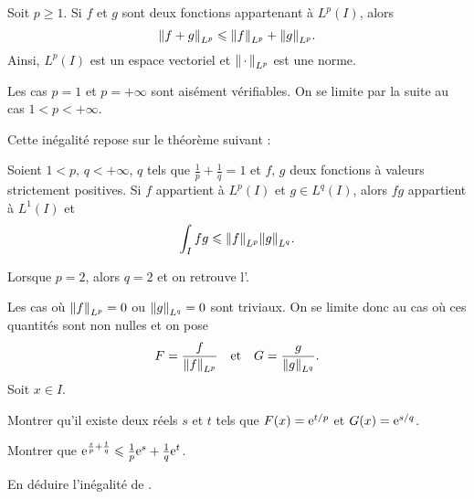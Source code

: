 \begin{theo}
Soit $p \geqslant 1$. Si $f$ et $g$ sont deux fonctions appartenant à $L^p(I)$, alors
\[
\norm{f + g}_{L^p} \leqslant \norm{f}_{L^p} + \norm{g}_{L^p}.
\]
Ainsi, $L^p(I)$ est un espace vectoriel et $\norm{\,\cdot\,}_{L^p}$ est une norme.
\end{theo}

\begin{remarque}
Les cas $p = 1$ et $p = +\infty$ sont aisément vérifiables. On se limite par la suite au cas $1 < p < +\infty$.
\end{remarque}

Cette inégalité repose sur le théorème suivant :
\begin{theo}
Soient $1 < p,\, q < +\infty$, $q$ tels que $\frac{1}{p} + \frac{1}{q} = 1$ et $f,\, g$ deux fonctions à valeurs strictement positives. Si $f$ appartient à $L^p(I)$ et $g \in L^q(I)$, alors $f g$ appartient à $L^1(I)$ et
\[
\int_I f g \leqslant \norm{f}_{L^p} \norm{g}_{L^q}.
\]
\end{theo}

\begin{remarque}
Lorsque $p = 2$, alors $q = 2$ et on retrouve l'.
\end{remarque}

\begin{exercice}
Les cas où $\norm{f}_{L^p} = 0$ ou $\norm{g}_{L^q} = 0$ sont triviaux. On se limite donc au cas où ces quantités sont non nulles et on pose
\[
F = \frac{f}{\norm{f}_{L^p}}
\quad \text{et} \quad
G = \frac{g}{\norm{g}_{L^q}}.
\]
Soit $x \in I$.
\begin{questions}
\item Montrer qu'il existe deux réels $s$ et $t$ tels que $F(x) = \mathrm{e}^{t/p}$ et $G(x) = \mathrm{e}^{s/q}$.

\item Montrer que $\mathrm{e}^{\frac{s}{p} + \frac{t}{q}} \leqslant \frac{1}{p} \mathrm{e}^s + \frac{1}{q} \mathrm{e}^t$.

\item En déduire l'inégalité de .
\end{questions}
\end{exercice}

